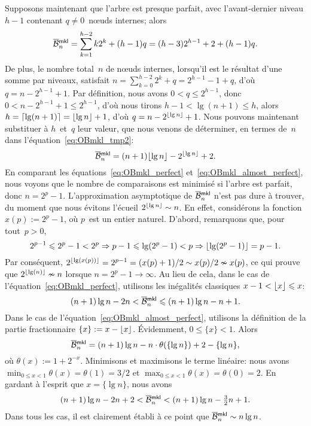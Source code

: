Supposons maintenant que l'arbre est presque parfait, avec
l'avant-dernier niveau \(h-1\) contenant \(q \neq 0\)~nœuds
internes; alors
\begin{equation}
\OB{\fun{mkl}}{n} = \sum_{k=1}^{h-2}k2^k + (h-1)q
= (h-3)2^{h-1} + 2 + (h-1)q.
\label{eq:OBmkl_tmp2}
\end{equation}
De plus, le nombre total~\(n\) de nœuds internes, lorsqu'il est le
résultat d'une somme par niveaux, satisfait \(n = \sum_{k=0}^{h-2}2^k
+ q = 2^{h-1} - 1 + q\), d'où \(q = n - 2^{h-1} + 1\). Par définition,
nous avons \(0 < q \leqslant 2^{h-1}\), donc \(0 < n - 2^{h-1} + 1
\leqslant 2^{h-1}\), d'où nous tirons \(h - 1 < \lg(n+1) \leqslant
h\), alors \(h = \lceil{\lg(n+1)}\rceil = \lfloor{\lg n}\rfloor + 1\), d'où \(q =
n - 2^{\lfloor{\lg n}\rfloor} + 1\). Nous pouvons maintenant substituer à
\(h\)~et~\(q\) leur valeur, que nous venons de déterminer, en termes
de~\(n\) dans l'équation~\eqref{eq:OBmkl_tmp2}:
\begin{equation}
\OB{\fun{mkl}}{n} = (n+1)\floor{\lg n} - 2^{\floor{\lg n}} + 2.
\label{eq:OBmkl_almost_perfect}
\end{equation}
En comparant les équations~\eqref{eq:OBmkl_perfect}
et~\eqref{eq:OBmkl_almost_perfect}, nous voyons que le nombre de
comparaisons est minimisé si l'arbre est parfait, donc \(n = 2^p -
1\). L'approximation asymptotique de \(\OB{\fun{mkl}}{n}\) n'est pas
dure à trouver, du moment que nous évitons l'écueil \(2^{\lfloor{\lg
    n}\rfloor} \sim n\). En effet, considérons la fonction \(x(p) := 2^p -
1\), où \(p\)~est un entier naturel. D'abord, remarquons que, pour
tout~\(p>0\),
\begin{equation*}
2^{p-1} \leqslant 2^p - 1 < 2^p \Rightarrow p-1 \leqslant \lg(2^p-1) <
p \Rightarrow \lfloor{\lg(2^p-1)}\rfloor = p-1.
\end{equation*}
Par conséquent, \(2^{\lfloor{\lg(x(p))}\rfloor} = 2^{p-1} = (x(p)+1)/2 \sim
x(p)/2 \nsim x(p)\), ce qui prouve que \(2^{\lfloor{\lg(n)}\rfloor} \nsim n\)
lorsque \(n=2^p-1 \rightarrow \infty\). Au lieu de cela, dans le cas
de l'équation~\eqref{eq:OBmkl_perfect}, utilisons les inégalités
classiques \(x - 1 < \lfloor{x}\rfloor \leqslant x\):
\begin{equation*}
(n+1)\lg n - 2n < \OB{\fun{mkl}}{n} \leqslant (n+1)\lg n - n + 1.
\end{equation*}
Dans le cas de l'équation~\eqref{eq:OBmkl_almost_perfect}, utilisons
la définition de la partie fractionnaire
\(\{x\} := x - \lfloor{x}\rfloor\). Évidemment, \(0 \leqslant \{x\} <
1\). Alors
\begin{equation*}
\OB{\fun{mkl}}{n} = (n+1)\lg n - n \cdot \theta(\{\lg n\})
                    + 2 - \{\lg n\},
\end{equation*}
où \(\theta(x) := 1 + 2^{-x}\). Minimisons et maximisons le terme
linéaire: nous avons \(\min_{0 \leqslant x < 1}\theta(x) = \theta(1) =
3/2\) et \(\max_{0 \leqslant x < 1}\theta(x) = \theta(0) =
2\). En gardant à l'esprit que \(x=\{\lg n\}\), nous avons
\begin{equation*}
(n+1)\lg n - 2n + 2 < \OB{\fun{mkl}}{n} < (n+1)\lg n - \tfrac{3}{2}n + 1.
\end{equation*}
Dans tous les cas, il est clairement établi à ce point que
\(\OB{\fun{mkl}}{n} \sim n\lg n\).


